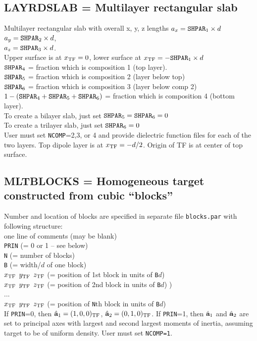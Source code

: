 \subsection{ LAYRDSLAB = Multilayer rectangular slab
            \label{sec:LAYRDSLAB}}
        Multilayer rectangular slab with overall x, y, z
	lengths 
	$a_x = {\tt SHPAR}_1\times d$ \\
	$a_y = {\tt SHPAR}_2\times d$,\\
	$a_z = {\tt SHPAR}_3\times d$.\\
	Upper surface is at $x_{\rm TF}=0$, lower surface at $x_{\rm TF}=-{\tt SHPAR}_1\times d$\\
	${\tt SHPAR}_4$ = fraction which is composition 1 (top layer).\\
	${\tt SHPAR}_5$ = fraction which is composition 2 (layer below top)\\
	${\tt SHPAR}_6$ = fraction which is composition 3 (layer below comp 2)\\
	$1-({\tt SHPAR}_4+{\tt SHPAR}_5+{\tt SHPAR}_6)$ = fraction which is
	composition 4 (bottom layer).\\
	To create a bilayer slab, just set 
	${\tt SHPAR}_5={\tt SHPAR}_6=0$\\
	To create a trilayer slab, just set ${\tt SHPAR}_6=0$\\
	User must set {\tt NCOMP}=2,3, or 4 and provide dielectric function
	files for each of the two layers.
	Top dipole layer is at $x_{\rm TF}=-d/2$.
	Origin of TF is at center of top surface.
\subsection{ MLTBLOCKS = Homogeneous target constructed from cubic ``blocks''
            \label{sec:MLTBLOCKS}}
	Number and location of blocks are specified in separate file 
	{\tt blocks.par} with following structure:\\
	 one line of comments (may be blank)\\
	 {\tt PRIN} (= 0 or 1 -- see below)\\
	 {\tt N} (= number of blocks) \\
	 {\tt B}  (= width/$d$ of one block) \\
	 $x_{\rm TF}$ $y_{\rm TF}$ $z_{\rm TF}$ 
		(= position of 1st block in units of {\tt B}$d$)\\
	 $x_{\rm TF}$ $y_{\rm TF}$ $z_{\rm TF}$ 
	(= position of 2nd block in units of {\tt B}$d$) )\\
	 ... \\
	 $x_{\rm TF}$ $y_{\rm TF}$ $z_{\rm TF}$ 
	        (= position of {\tt N}th block in units of {\tt B}$d$)\\
	If {\tt PRIN}=0, then ${\hat{\bf a}}_1=(1,0,0)_{\rm TF}$, 
	${\hat{\bf a}}_2=(0,1,0)_{\rm TF}$.
	If {\tt PRIN}=1, then ${\hat{\bf a}}_1$ and ${\hat{\bf a}}_2$ are set 
	to principal 
	axes with largest and second largest moments of inertia,
	assuming target to be of uniform density.
	User must set {\tt NCOMP=1}.
